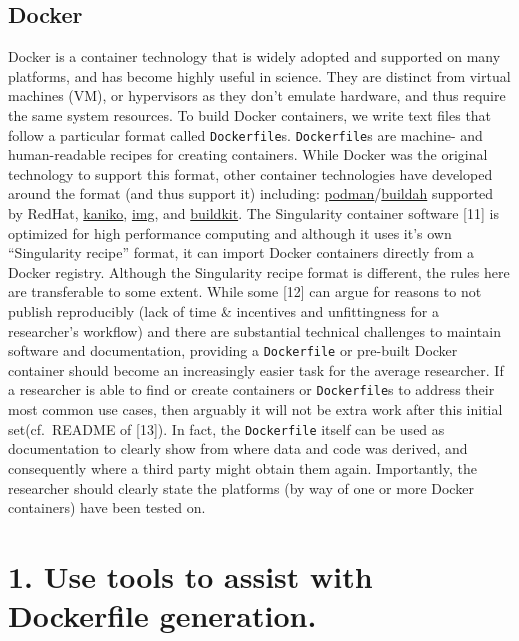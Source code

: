 \documentclass[10pt,letterpaper]{article}
\begin{document}
\hypertarget{docker}{%
\subsection*{Docker}\label{docker}}

Docker is a container technology that is widely adopted and supported on
many platforms, and has become highly useful in science. They are
distinct from virtual machines (VM), or hypervisors as they don't
emulate hardware, and thus require the same system resources. To build
Docker containers, we write text files that follow a particular format
called \texttt{Dockerfile}s. \texttt{Dockerfile}s are machine- and
human-readable recipes for creating containers. While Docker was the
original technology to support this format, other container technologies
have developed around the format (and thus support it) including:
\href{https://podman.io/}{podman}/\href{https://github.com/containers/buildah}{buildah}
supported by RedHat,
\href{https://github.com/GoogleContainerTools/kaniko}{kaniko},
\href{https://github.com/genuinetools/img}{img}, and
\href{https://github.com/moby/buildkit}{buildkit}. The Singularity
container software {[}11{]} is optimized for high performance computing
and although it uses it's own ``Singularity recipe'' format, it can
import Docker containers directly from a Docker registry. Although the
Singularity recipe format is different, the rules here are transferable
to some extent. While some {[}12{]} can argue for reasons to not publish
reproducibly (lack of time \& incentives and unfittingness for a
researcher's workflow) and there are substantial technical challenges to
maintain software and documentation, providing a \texttt{Dockerfile} or
pre-built Docker container should become an increasingly easier task for
the average researcher. If a researcher is able to find or create
containers or \texttt{Dockerfile}s to address their most common use
cases, then arguably it will not be extra work after this initial
set(cf.~README of {[}13{]}). In fact, the \texttt{Dockerfile} itself can
be used as documentation to clearly show from where data and code was
derived, and consequently where a third party might obtain them again.
Importantly, the researcher should clearly state the platforms (by way
of one or more Docker containers) have been tested on.

\hypertarget{use-tools-to-assist-with-dockerfile-generation.}{%
\section*{1. Use tools to assist with Dockerfile
generation.}\label{use-tools-to-assist-with-dockerfile-generation.}}
\end{document}
